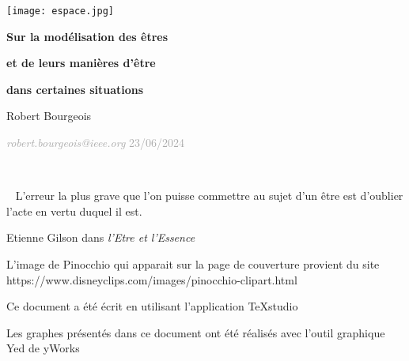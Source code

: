 \documentclass[a4paper, 12pt, openright, french]{book}
\makeatletter
\renewcommand*{\pagenumbering}[1]{%
	\gdef\thepage{\csname @#1\endcsname\c@page}%
}
\newenvironment{nom}{\fontsize{18pt}{18pt} \selectfont}
\makeatother
\begin{document}
	
\pagenumbering{gobble}   %
\afterpage{\restorepagecolor}	

\texttt{[image: espace.jpg]} 

\begin{doublespace}
\centering
\fontsize{30pt}{30pt}
	\textbf{Sur la modélisation des êtres}
	
	\textbf{et de leurs manières d'être}
		
	\textbf{dans certaines situations}
\end{doublespace}

\begin{nom}
\vspace{0.5cm plus 0.5cm}
 Robert Bourgeois
\end{nom}


\fontsize{12pt}{12pt}
\vspace*{15cm plus 0.5cm}
\textcolor{darkgray}{\emph{robert.bourgeois@ieee.org \hspace{7cm plus 0.5cm}} \fontsize{9pt}{9pt} 23/06/2024}





\newpage
\setcounter{page}{0}
\pagenumbering{arabic}
~ 
 
\newpage
\vspace*{2cm plus 0.5cm}
\hspace*{4cm plus 0.5cm} {~ L'erreur la plus grave que l'on puisse commettre au sujet}
\hspace*{4cm plus 0.5cm} { d'un être est d'oublier l'acte en vertu duquel il est.}

\hspace*{4cm plus 0.5cm} {Etienne Gilson dans} \emph{l'Etre et
l'Essence}



\vspace*{15cm plus 0.5cm}
L'image de Pinocchio qui apparait sur la page de couverture provient du site https://www.disneyclips.com/images/pinocchio-clipart.html

Ce document a été écrit en utilisant l'application TeXstudio

Les graphes présentés dans ce document ont été réalisés avec l'outil graphique Yed de yWorks
\end{document}
